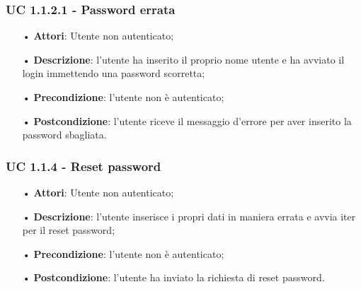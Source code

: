 \subsubsection{UC 1.1.2.1  - Password errata}
\begin{itemize}
\item[•]\textbf{Attori}: Utente non autenticato;
\item[•]\textbf{Descrizione}: l'utente ha inserito il proprio nome utente e ha avviato il login immettendo una password scorretta;
\item[•]\textbf{Precondizione}: l'utente non è autenticato;
\item[•]\textbf{Postcondizione}: l'utente riceve il messaggio d'errore per aver inserito la password sbagliata.
\end{itemize}

\subsubsection{UC 1.1.4 - Reset password}
\begin{itemize}
	\item[•]\textbf{Attori}: Utente non autenticato;
	\item[•]\textbf{Descrizione}: l’utente inserisce i propri dati in maniera errata e avvia iter per il reset password;
	\item[•]\textbf{Precondizione}: l’utente non è autenticato;
	\item[•]\textbf{Postcondizione}: l’utente ha inviato la richiesta di reset password.
\end{itemize}

